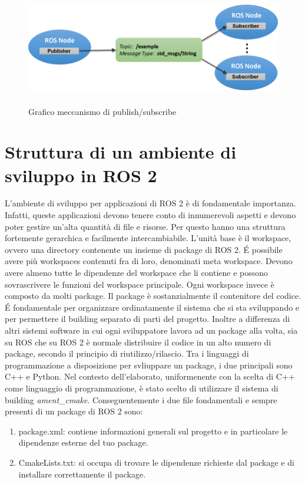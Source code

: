 \documentclass[a4paper,11 pt,oneside]{book}
\theoremstyle{definition}
\begin{document}
\begin{figure}[!htbp]
\centering
\includegraphics[width=14cm, height=5cm]{pub-sub-topic.png}
\caption{Grafico meccanismo di publish/subscribe}
\label{p/s}
\end{figure}
\vspace{3cm}
\section{Struttura di un ambiente di sviluppo in ROS 2}
L'ambiente di sviluppo per applicazioni di ROS 2 è di fondamentale importanza. Infatti, queste applicazioni devono tenere conto di innumerevoli aspetti e devono poter gestire un'alta quantità di file e risorse.
Per questo hanno una struttura fortemente gerarchica e facilmente intercambiabile.
L'unità base è il workspace, ovvero una directory contenente un insieme di package di ROS 2.
\'E possibile avere più workspaces contenuti fra di loro, denominati meta workspace. Devono avere almeno tutte le dipendenze del workspace che li contiene e  possono sovrascrivere le funzioni del workspace principale.
Ogni workspace invece è composto da molti package. Il package è sostanzialmente il contenitore del codice. \'E fondamentale per organizzare ordinatamente il sistema che si sta sviluppando e per permettere il building separato di parti del progetto. Inoltre a differenza di altri sistemi software in cui ogni sviluppatore lavora ad un package alla volta, sia su ROS che su ROS 2 è normale distribuire il codice in un alto numero di package, secondo il principio di riutilizzo/rilascio.
Tra i linguaggi di programmazione a disposizione per svliuppare un package, i due principali sono C++ e Python. Nel contesto dell'elaborato, uniformenente con la scelta di C++ come linguaggio di programmazione, è stato scelto di utilizzare il sistema di building \emph{ament\_cmake}.
Conseguentemente i due file fondamentali e sempre presenti di un package di ROS 2 sono:
\begin{enumerate}
  \item package.xml: contiene informazioni generali sul progetto e in particolare le dipendenze esterne del tuo package.
  \item CmakeLists.txt: si occupa di trovare le dipendenze richieste dal package e di installare correttamente il package.
\end{enumerate}
\end{document}
